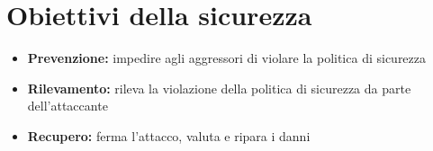 \section{Obiettivi della sicurezza}
\begin{itemize}
    \item \textbf{Prevenzione:} impedire agli aggressori di violare la politica di sicurezza
    \item \textbf{Rilevamento:} rileva la violazione della politica di sicurezza da parte dell'attaccante
    \item \textbf{Recupero:} ferma l'attacco, valuta e ripara i danni
\end{itemize}


